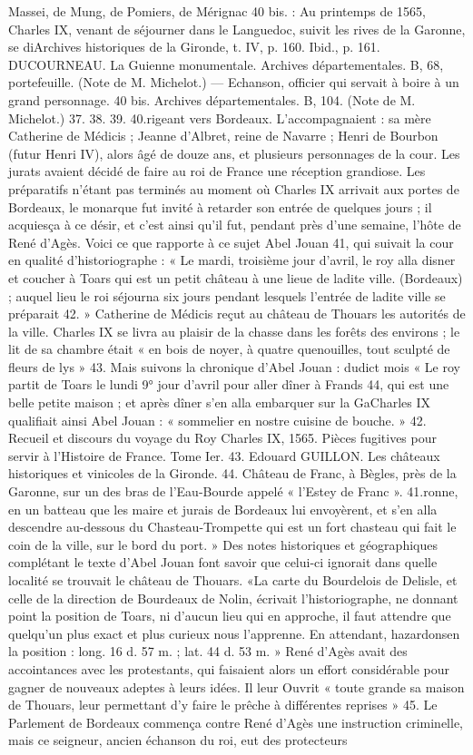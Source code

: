 Massei, de Mung, de Pomiers, de Mérignac 40 bis. : Au printemps de 1565, Charles IX, venant de séjourner dans le Languedoc, suivit les rives de la Garonne, se diArchives historiques de la Gironde, t. IV, p. 160. Ibid., p. 161. DUCOURNEAU. La Guienne monumentale. Archives départementales. B, 68, portefeuille. (Note de M. Michelot.) — Echanson, officier qui servait à boire à un grand personnage. 40 bis. Archives départementales. B, 104. (Note de M. Michelot.) 37. 38. 39. 40.rigeant vers Bordeaux. L'accompagnaient : sa mère Catherine de Médicis ; Jeanne d'Albret, reine de Navarre ; Henri de Bourbon (futur Henri IV), alors âgé de douze ans, et plusieurs personnages de la cour. Les jurats avaient décidé de faire au roi de France une réception grandiose. Les préparatifs n'étant pas terminés au moment où Charles IX arrivait aux portes de Bordeaux, le monarque fut invité à retarder son entrée de quelques jours ; il acquiesça à ce désir, et c'est ainsi qu'il fut, pendant près d'une semaine, l'hôte de René d'Agès. Voici ce que rapporte à ce sujet Abel Jouan 41, qui suivait la cour en qualité d'historiographe : « Le mardi, troisième jour d'avril, le roy alla disner et coucher à Toars qui est un petit château à une lieue de ladite ville. (Bordeaux) ; auquel lieu le roi séjourna six jours pendant lesquels l'entrée de ladite ville se préparait 42. » Catherine de Médicis reçut au château de Thouars les autorités de la ville. Charles IX se livra au plaisir de la chasse dans les forêts des environs ; le lit de sa chambre était « en bois de noyer, à quatre quenouilles, tout sculpté de fleurs de lys » 43. Mais suivons la chronique d'Abel Jouan : dudict mois « Le roy partit de Toars le lundi 9° jour d'avril pour aller dîner à Frands 44, qui est une belle petite maison ; et après dîner s'en alla embarquer sur la GaCharles IX qualifiait ainsi Abel Jouan : « sommelier en nostre cuisine de bouche. » 42. Recueil et discours du voyage du Roy Charles IX, 1565. Pièces fugitives pour servir à l'Histoire de France. Tome Ier. 43. Edouard GUILLON. Les châteaux historiques et vinicoles de la Gironde. 44. Château de Franc, à Bègles, près de la Garonne, sur un des bras de l'Eau-Bourde appelé « l'Estey de Franc ». 41.ronne, en un batteau que les maire et jurais de Bordeaux lui envoyèrent, et s'en alla descendre au-dessous du Chasteau-Trompette qui est un fort chasteau qui fait le coin de la ville, sur le bord du port. » Des notes historiques et géographiques complétant le texte d'Abel Jouan font savoir que celui-ci ignorait dans quelle localité se trouvait le château de Thouars. «La carte du Bourdelois de Delisle, et celle de la direction de Bourdeaux de Nolin, écrivait l'historiographe, ne donnant point la position de Toars, ni d'aucun lieu qui en approche, il faut attendre que quelqu'un plus exact et plus curieux nous l'apprenne. En attendant, hazardonsen la position : long. 16 d. 57 m. ; lat. 44 d. 53 m. » René d'Agès avait des accointances avec les protestants, qui faisaient alors un effort considérable pour gagner de nouveaux adeptes à leurs idées. Il leur Ouvrit « toute grande sa maison de Thouars, leur permettant d'y faire le prêche à différentes reprises » 45. Le Parlement de Bordeaux commença contre René d'Agès une instruction criminelle, mais ce seigneur, ancien échanson du roi, eut des protecteurs 